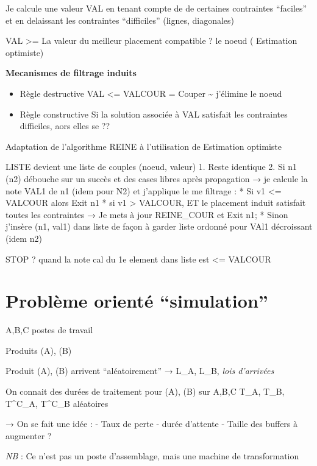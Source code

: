 \documentclass[]{article}
\begin{document}
Je calcule une valeur VAL en tenant compte de de certaines contraintes
``faciles'' et en delaissant les contraintes ``difficiles'' (lignes,
diagonales)

VAL \textgreater{}= La valeur du meilleur placement compatible ? le
noeud ( Estimation optimiste)

\textbf{Mecanismes de filtrage induits}

\begin{itemize}
\tightlist
\item
  Règle destructive VAL \textless{}= VALCOUR \textbar{}= Couper
  \textasciitilde{} j'élimine le noeud
\item
  Règle constructive Si la solution associée à VAL satisfait les
  contraintes difficiles, aors elles se ??
\end{itemize}

Adaptation de l'algorithme REINE à l'utilisation de Estimation optimiste

LISTE devient une liste de couples (noeud, valeur) 1. Reste identique 2.
Si n1 (n2) débouche sur un succès et des cases libres après propagation
→ je calcule la note VAL1 de n1 (idem pour N2) et j'applique le me
filtrage : * Si v1 \textless{}= VALCOUR alors Exit n1 * si v1
\textgreater{} VALCOUR, ET le placement induit satisfait toutes les
contraintes → Je mets à jour REINE\_COUR et Exit n1; * Sinon j'insère
(n1, val1) dans liste de façon à garder liste ordonné pour VAl1
décroissant (idem n2)

STOP ? quand la note cal du 1e element dans liste est \textless{}=
VALCOUR

\section{\texorpdfstring{Problème orienté
``simulation''}{Problème orienté simulation}}\label{probluxe8me-orientuxe9-simulation}

A,B,C postes de travail

Produits (A), (B)

Produit (A), (B) arrivent ``aléatoirement'' → L\_A, L\_B, \emph{lois
d'arrivées}

On connait des durées de traitement pour (A), (B) sur A,B,C T\_A, T\_B,
T\^{}C\_A, T\^{}C\_B aléatoires

→ On se fait une idée : - Taux de perte - durée d'attente - Taille des
buffers à augmenter ?

\emph{NB} : Ce n'est pas un poste d'assemblage, mais une machine de
transformation
\end{document}
